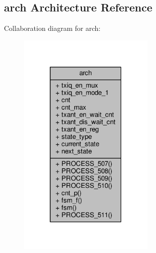 \subsection{arch Architecture Reference}
\label{classtxiq__ctrl_1_1arch}


Collaboration diagram for arch\+:\nopagebreak
\begin{figure}[H]
\begin{center}
\leavevmode
\includegraphics[width=187pt]{dd/d3f/classtxiq__ctrl_1_1arch__coll__graph}
\end{center}
\end{figure}
